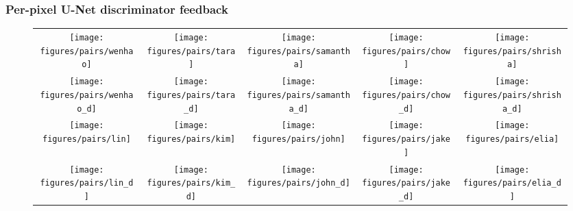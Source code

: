 \documentclass[10pt,twocolumn,letterpaper]{article}
\begin{document}
\subsubsection*{Per-pixel U-Net discriminator feedback}
\begin{figure*}
	\begin{centering}
		\setlength{\tabcolsep}{0.1em}
		\renewcommand{\arraystretch}{0}
		\par\end{centering}
	\begin{centering}
		\begin{tabular}{@{}c@{\hskip 0.05in }c@{\hskip 0.05in }c@{\hskip 0.05in }c@{\hskip 0.05in }c@{}}

			{\footnotesize{}}\texttt{[image: figures/pairs/wenhao]} &
			{\footnotesize{}}\texttt{[image: figures/pairs/tara]} &
			{\footnotesize{}}\texttt{[image: figures/pairs/samantha]} &
			{\footnotesize{}}\texttt{[image: figures/pairs/chow]} &
			{\footnotesize{}}\texttt{[image: figures/pairs/shrisha]} \\

			{\footnotesize{}}\texttt{[image: figures/pairs/wenhao\_d]} &
			{\footnotesize{}}\texttt{[image: figures/pairs/tara\_d]} &
			{\footnotesize{}}\texttt{[image: figures/pairs/samantha\_d]} &
			{\footnotesize{}}\texttt{[image: figures/pairs/chow\_d]} &
			{\footnotesize{}}\texttt{[image: figures/pairs/shrisha\_d]} \\

			{\footnotesize{}}\texttt{[image: figures/pairs/lin]} &
			{\footnotesize{}}\texttt{[image: figures/pairs/kim]} &
			{\footnotesize{}}\texttt{[image: figures/pairs/john]} &
			{\footnotesize{}}\texttt{[image: figures/pairs/jake]} &
			{\footnotesize{}}\texttt{[image: figures/pairs/elia]} \\

			{\footnotesize{}}\texttt{[image: figures/pairs/lin\_d]} &
			{\footnotesize{}}\texttt{[image: figures/pairs/kim\_d]} &
			{\footnotesize{}}\texttt{[image: figures/pairs/john\_d]} &
			{\footnotesize{}}\texttt{[image: figures/pairs/jake\_d]} &
			{\footnotesize{}}\texttt{[image: figures/pairs/elia\_d]}\\
			

\end{tabular}
\end{centering}
\end{figure*}
\end{document}
